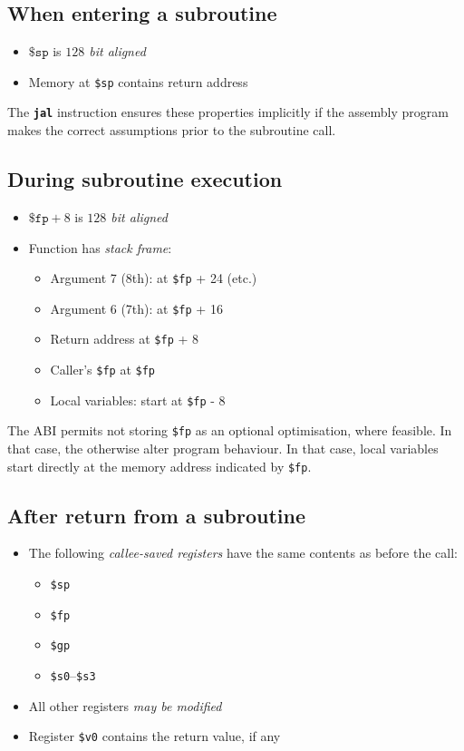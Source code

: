\documentclass{article}
\newcommand{\insn}[1]{\texttt{\textbf{\textcolor{dblue}{#1}}}}
\begin{document}
\subsection{When entering a subroutine}
    \begin{itemize}
    \item $\texttt{\$sp}$ is \emph{$128$ bit aligned}
    \item Memory at \texttt{\$sp} contains return address
    \end{itemize}

    The \insn{jal} instruction ensures these properties implicitly if the assembly
    program makes the correct assumptions prior to the subroutine call.

\subsection{During subroutine execution}
    \begin{itemize}
    \item $\texttt{\$fp} + 8$ is \emph{$128$ bit aligned}
    \item Function has \emph{stack frame}:
      \begin{itemize}
        \item Argument 7 (8th): at \texttt{\$fp} + 24 (etc.)
        \item Argument 6 (7th): at \texttt{\$fp} + 16
        \item Return address at \texttt{\$fp} + 8
        \item Caller's \texttt{\$fp} at \texttt{\$fp}
        \item Local variables: start at \texttt{\$fp} - 8
      \end{itemize}
    \end{itemize}

    The ABI permits not storing \texttt{\$fp} as an optional
    optimisation, where feasible.  In that case, the otherwise alter
    program behaviour.  In that case, local variables start directly
    at the memory address indicated by \texttt{\$fp}.

\subsection{After return from a subroutine}
  \begin{itemize}
    \item The following \emph{callee-saved registers} have the same contents as before the call:
      \begin{itemize}
        \item \texttt{\$sp}
        \item \texttt{\$fp}
        \item \texttt{\$gp}
        \item \texttt{\$s0}--\texttt{\$s3}
      \end{itemize}
    \item All other registers \emph{may be modified}
    \item Register \texttt{\$v0} contains the return value, if any
  \end{itemize}
\end{document}
